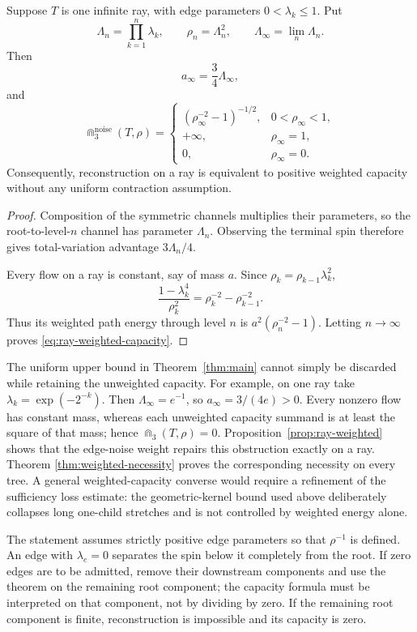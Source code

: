 \begin{proposition}
\label{prop:ray-weighted}
Suppose $T$ is one infinite ray, with edge parameters
$0<\lambda_k\le1$. Put
\[
 \Lambda_n=\prod_{k=1}^n\lambda_k,
 \qquad \rho_n=\Lambda_n^2,
 \qquad \Lambda_\infty=\lim_n\Lambda_n.
\]
Then
\[
 a_\infty=\frac34\Lambda_\infty,
\]
and
\begin{equation}\label{eq:ray-weighted-capacity}
 \Cap_3^{\mathrm{noise}}(T,\rho)=
 \begin{cases}
  (\rho_\infty^{-2}-1)^{-1/2},&0<\rho_\infty<1,\\
  +\infty,&\rho_\infty=1,\\
  0,&\rho_\infty=0.
 \end{cases}
\end{equation}
Consequently, reconstruction on a ray is equivalent to positive weighted
capacity without any uniform contraction assumption.
\end{proposition}

\begin{proof}
Composition of the symmetric channels multiplies their parameters, so the
root-to-level-$n$ channel has parameter $\Lambda_n$. Observing the terminal
spin therefore gives total-variation advantage $3\Lambda_n/4$.

Every flow on a ray is constant, say of mass $a$. Since
$\rho_k=\rho_{k-1}\lambda_k^2$,
\[
 \frac{1-\lambda_k^4}{\rho_k^2}
 =\rho_k^{-2}-\rho_{k-1}^{-2}.
\]
Thus its weighted path energy through level $n$ is
$a^2(\rho_n^{-2}-1)$. Letting $n\to\infty$ proves
\eqref{eq:ray-weighted-capacity}.
\end{proof}

The uniform upper bound in Theorem~\ref{thm:main} cannot simply be discarded
while retaining the unweighted capacity. For example, on one ray take
$\lambda_k=\exp(-2^{-k})$. Then $\Lambda_\infty=e^{-1}$, so
$a_\infty=3/(4e)>0$. Every nonzero flow has constant mass, whereas each
unweighted capacity summand is at least the square of that mass; hence
$\Cap_3(T,\rho)=0$. Proposition~\ref{prop:ray-weighted} shows that the
edge-noise weight repairs this obstruction exactly on a ray. Theorem
\ref{thm:weighted-necessity} proves the corresponding necessity on every
tree. A general weighted-capacity converse would require a refinement of the
sufficiency loss estimate: the geometric-kernel bound used above deliberately
collapses long one-child stretches and is not controlled by weighted energy
alone.

\begin{remark}
The statement assumes strictly positive edge parameters so that
$\rho^{-1}$ is defined. An edge with $\lambda_e=0$ separates the spin
below it completely from the root. If zero edges are to be admitted,
remove their downstream components and use the theorem on the remaining
root component; the capacity formula must be interpreted on that
component, not by dividing by zero. If the remaining root component is
finite, reconstruction is impossible and its capacity is zero.
\end{remark}

